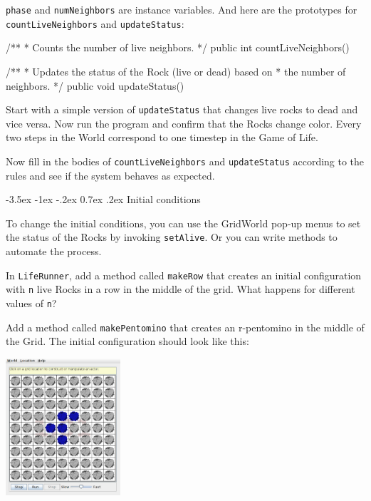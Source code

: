 \documentclass[12pt]{book}
\makeatletter
\renewcommand{\section}{\@startsection {section}{1}{\z@}%
    {-3.5ex \@plus -1ex \@minus -.2ex}%
    {0.7ex \@plus.2ex}%
    {\normalfont\Large\bfseries}}
\theoremstyle{exercise}
\newcommand{\java}[1]{\lstinline{#1}} %
\makeatother
\begin{document}
\java{phase} and \java{numNeighbors} are instance variables.
And here are the prototypes for \java{countLiveNeighbors} and \java{updateStatus}:

\begin{code}
    /**
     * Counts the number of live neighbors.
     */
    public int countLiveNeighbors()

    /**
     * Updates the status of the Rock (live or dead) based on
     * the number of neighbors.
     */
    public void updateStatus()
\end{code}

Start with a simple version of \java{updateStatus} that changes live rocks to dead and vice versa.
Now run the program and confirm that the Rocks change color.
Every two steps in the World correspond to one timestep in the Game of Life.

Now fill in the bodies of \java{countLiveNeighbors} and \java{updateStatus} according to the rules and see if the system behaves as expected.


\section{Initial conditions}

To change the initial conditions, you can use the GridWorld pop-up menus to set the status of the Rocks by invoking \java{setAlive}.
Or you can write methods to automate the process.

In \java{LifeRunner}, add a method called \java{makeRow} that creates an initial configuration with \java{n} live Rocks in a row in the middle of the grid.
What happens for different values of \java{n}?

Add a method called \java{makePentomino} that creates an r-pentomino in the middle of the Grid.
The initial configuration should look like this:

\begin{center}
\includegraphics[height=2in]{figs/LifeRunner.pdf}
\end{center}
\end{document}
